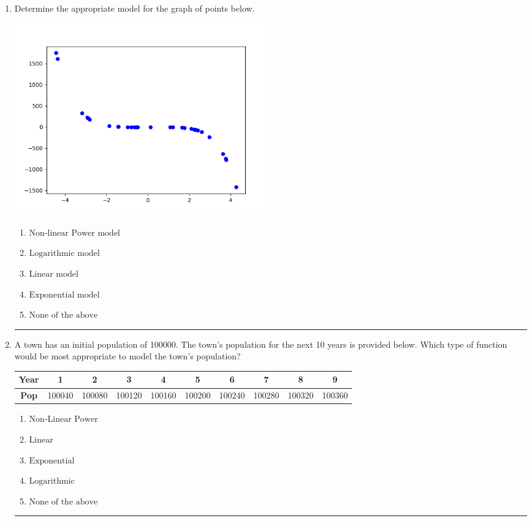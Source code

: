 \documentclass[14pt]{extbook}
\newcommand{\litem}[1]{\item#1\hspace*{-1cm}\rule{\textwidth}{0.4pt}}
\begin{document}
\begin{enumerate}
{\begin{enumerate}[label=\Alph*.]
\end{enumerate} }
\litem{
Determine the appropriate model for the graph of points below.
\begin{center}
    \includegraphics[width=0.5\textwidth]{../Figures/identifyModelGraph11C.png}
\end{center}
\begin{enumerate}[label=\Alph*.]
\item \( \text{Non-linear Power model} \)
\item \( \text{Logarithmic model} \)
\item \( \text{Linear model} \)
\item \( \text{Exponential model} \)
\item \( \text{None of the above} \)

\end{enumerate} }
\litem{
A town has an initial population of 100000. The town's population for the next 10 years is provided below. Which type of function would be most appropriate to model the town's population?

\begin{tabular}{c|c|c|c|c|c|c|c|c|c}
\textbf{Year} &1 &2 &3 &4 &5 &6 &7 &8 &9\tabularnewline \hline
\textbf{Pop} &100040 &100080 &100120 &100160 &100200 &100240 &100280 &100320 &100360\end{tabular}\begin{enumerate}[label=\Alph*.]
\item \( \text{Non-Linear Power} \)
\item \( \text{Linear} \)
\item \( \text{Exponential} \)
\item \( \text{Logarithmic} \)
\item \( \text{None of the above} \)


\end{enumerate}}
\end{enumerate}
\end{document}

